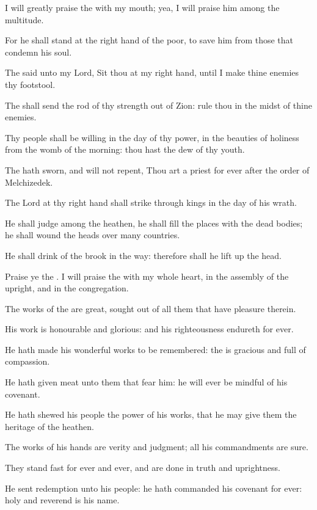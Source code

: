 \Verse I will greatly praise the \LORD with my mouth; yea, I will praise him among the multitude.

\Verse For he shall stand at the right hand of the poor, to save him from those that condemn his soul.




\Chapter
\Verse The \LORD said unto my Lord, Sit thou at my right hand, until I make thine enemies thy footstool.

\Verse The \LORD shall send the rod of thy strength out of Zion: rule thou in the midst of thine enemies.

\Verse Thy people shall be willing in the day of thy power, in the beauties of holiness from the womb of the morning: thou hast the dew of thy youth.

\Verse The \LORD hath sworn, and will not repent, Thou art a priest for ever after the order of Melchizedek.

\Verse The Lord at thy right hand shall strike through kings in the day of his wrath.

\Verse He shall judge among the heathen, he shall fill the places with the dead bodies; he shall wound the heads over many countries.

\Verse He shall drink of the brook in the way: therefore shall he lift up the head.




\Chapter
\Verse Praise ye the \LORD. I will praise the \LORD with my whole heart, in the assembly of the upright, and in the congregation.

\Verse The works of the \LORD are great, sought out of all them that have pleasure therein.

\Verse His work is honourable and glorious: and his righteousness endureth for ever.

\Verse He hath made his wonderful works to be remembered: the \LORD is gracious and full of compassion.

\Verse He hath given meat unto them that fear him: he will ever be mindful of his covenant.

\Verse He hath shewed his people the power of his works, that he may give them the heritage of the heathen.

\Verse The works of his hands are verity and judgment; all his commandments are sure.

\Verse They stand fast for ever and ever, and are done in truth and uprightness.

\Verse He sent redemption unto his people: he hath commanded his covenant for ever: holy and reverend is his name.

